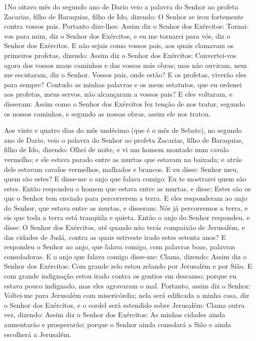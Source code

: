 
\lettrine{1} No oitavo mês do segundo ano de Dario veio a
palavra do Senhor ao profeta Zacarias, filho de Baraquias, filho de
Ido, dizendo: O Senhor se irou fortemente contra vossos pais.
Portanto dize-lhes: Assim diz o Senhor dos Exércitos: Tornai-vos
para mim, diz o Senhor dos Exércitos, e eu me tornarei para vós, diz
o Senhor dos Exércitos. E não sejais como vossos pais, aos quais
clamavam os primeiros profetas, dizendo: Assim diz o Senhor dos
Exércitos: Convertei-vos agora dos vossos maus caminhos e das vossas
más obras; mas não ouviram, nem me escutaram, diz o Senhor.
Vossos pais, onde estão? E os profetas, viverão eles para
sempre? Contudo as minhas palavras e os meus estatutos, que eu
ordenei aos profetas, meus servos, não alcançaram a vossos pais? E
eles voltaram, e disseram: Assim como o Senhor dos Exércitos fez
tenção de nos tratar, segundo os nossos caminhos, e segundo as
nossas obras, assim ele nos tratou.

Aos vinte e quatro dias do mês undécimo (que é o mês de Sebate),
no segundo ano de Dario, veio o palavra do Senhor ao profeta
Zacarias, filho de Baraquias, filho de Ido, dizendo: Olhei de
noite, e vi um homem montado num cavalo vermelho; e ele estava
parado entre as murtas que estavam na baixada; e atrás dele estavam
cavalos vermelhos, malhados e brancos. E eu disse: Senhor meu,
quem são estes? E disse-me o anjo que falava comigo: Eu te mostrarei
quem são estes. Então respondeu o homem que estava entre as
murtas, e disse: Estes são os que o Senhor tem enviado para
percorrerem a terra. E eles responderam ao anjo do Senhor,
que estava entre as murtas, e disseram: Nós já percorremos a terra,
e eis que toda a terra está tranqüila e quieta. Então o anjo
do Senhor respondeu, e disse: O Senhor dos Exércitos, até quando não
terás compaixão de Jerusalém, e das cidades de Judá, contra as quais
estiveste irado estes setenta anos? E respondeu o Senhor ao
anjo, que falava comigo, com palavras boas, palavras consoladoras.
E o anjo que falava comigo disse-me: Clama, dizendo: Assim
diz o Senhor dos Exércitos: Com grande zelo estou zelando por
Jerusalém e por Sião. E com grande indignação estou irado
contra os gentios em descanso; porque eu estava pouco indignado, mas
eles agravaram o mal. Portanto, assim diz o Senhor: Voltei-me
para Jerusalém com misericórdia; nela será edificada a minha casa,
diz o Senhor dos Exércitos, e o cordel será estendido sobre
Jerusalém: Clama outra vez, dizendo: Assim diz o Senhor dos
Exércitos: As minhas cidades ainda aumentarão e prosperarão; porque
o Senhor ainda consolará a Sião e ainda escolherá a Jerusalém.

